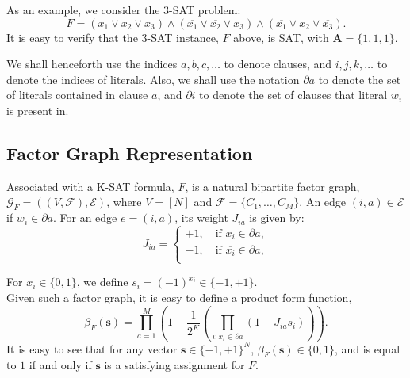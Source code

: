 \documentclass[letterpaper,english,11pt]{article}
\begin{document}
\begin{shaded*}
\begin{exmp}
As an example, we consider the 3-SAT problem:
\begin{equation*}
    F = (x_1\vee x_2\vee x_3)\wedge(\overline{x_1}\vee \overline{x_2}\vee x_3)\wedge(\overline{x_1}\vee x_2\vee \overline{x_3}).
\end{equation*}
It is easy to verify that the 3-SAT instance, $F$ above, is SAT, with $\mathbf{A} = \{1,1,1\}$.
\end{exmp}
\end{shaded*}
\begin{rem}
We shall henceforth use the indices $a,b,c,\ldots$ to denote clauses, and $i,j,k,\ldots$ to denote the indices of literals. Also, we shall use the notation $\partial a$ to denote the set of literals contained in clause $a$, and $\partial i$ to denote the set of clauses that literal $w_i$ is present in.
\end{rem}
\subsection{Factor Graph Representation}
Associated with a K-SAT formula, $F$, is a natural bipartite factor graph, $\mathscr{G}_{F} = ((V,\mathscr{F}),\mathscr{E})$, where $V=[N]$ and $\mathscr{F}=\{C_1,\ldots,C_M\}$. An edge $(i,a)\in \mathscr{E}$ if $w_i\in \partial a$. For an edge $e=(i,a)$, its weight $J_{ia}$ is given by:
\begin{equation*}
    J_{ia} = 
    \begin{cases}
    +1,\quad \text{if } x_i\in \partial a,\\
    -1,\quad \text{if } \overline{x_i}\in \partial a,\\
    \end{cases}
\end{equation*}

For $x_i\in \{0,1\}$, we define $s_i=(-1)^{x_i}\in \{-1,+1\}$.\\

Given such a factor graph, it is easy to define a product form function,
\begin{equation*}
    \beta_{F}(\mathbf{s}) = \prod_{a=1}^{M}\left(1-\frac{1}{2^K}\left(\prod_{i\colon x_i\in \partial a}\left(1-J_{ia}s_i\right)\right)\right).
\end{equation*}
It is easy to see that for any vector $\mathbf{s}\in \{-1,+1\}^{N}$, $\beta_{F}(\mathbf{s}) \in \{0,1\}$, and is equal to $1$ if and only if $\mathbf{s}$ is a satisfying assignment for $F$.\\
\end{document}
